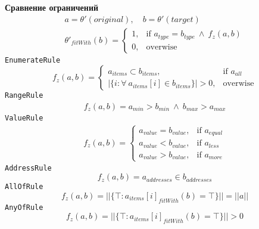 \documentclass[12pt]{report}
\def\code#1{\colorbox{light-gray}{\texttt{#1}}}
\begin{document}
\textbf{Сравнение ограничений}
\begin{equation}
\begin{aligned}
a = \theta'(original), \quad b = \theta'(target) \\
\theta'_{fitWith}(b) = \begin{cases}
	1, & \text{if } a_{type} = b_{type} \ \wedge \ f_z(a, b) \\
	0, & \text{overwise}
\end{cases}
\end{aligned}
\end{equation}
\code{EnumerateRule}
\begin{equation}
f_z(a, b) = \begin{cases}
	a_{items} \subset b_{items}, & \text{if } a_{all} \\
	|\{i: \forall \ a_{items}[i] \in b_{items}\}|> 0, & \text{overwise}
\end{cases}
\end{equation}
\code{RangeRule}
\begin{equation}
\begin{aligned}
f_z(a, b) = a_{min} > b_{min} \ \wedge \ b_{max} > a_{max}
\end{aligned}
\end{equation}
\code{ValueRule}
\begin{equation}
\begin{aligned}
f_z(a, b) = \begin{cases}
	a_{value} = b_{value}, & \text{if } a_{equal} \\
	a_{value} < b_{value}, & \text{if } a_{less} \\
	a_{value} > b_{value}, & \text{if } a_{more}
\end{cases}
\end{aligned}
\end{equation}
\code{AddressRule}
\begin{equation}
f_z(a, b) = a_{addresses} \in b_{addresses}
\end{equation}
\code{AllOfRule}
\begin{equation}
f_z(a, b) = ||\{\top: a_{items}[i]_{fitWith}(b) = \top\}|| = ||a||
\end{equation}
\code{AnyOfRule}
\begin{equation}
f_z(a, b) = ||\{\top: a_{items}[i]_{fitWith}(b) = \top\}|| > 0
\end{equation}
\end{document}
